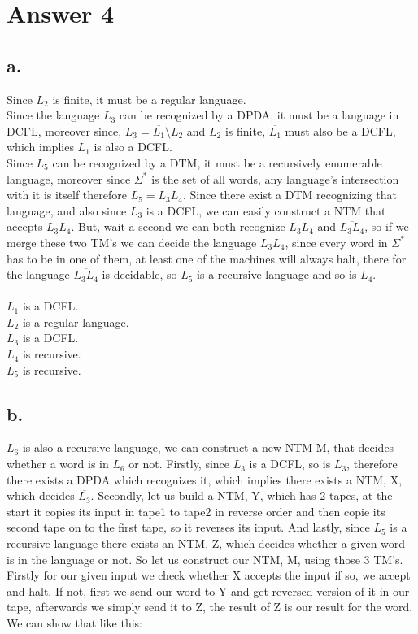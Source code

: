 \documentclass[12pt]{article}
\begin{document}
\section*{Answer 4}

\subsection*{a.}
Since $L_2$ is finite, it must be a regular language.\\
Since the language $L_3$ can be recognized by a DPDA, it must be a language in DCFL,
moreover since, $L_3=\overline{L_1}\setminus L_2$ and $L_2$ is finite, $\overline{L_1}$
must also be a DCFL, which implies $L_1$ is also a DCFL.\\
Since $L_5$ can be recognized by a DTM, it must be a recursively enumerable language, moreover
since $\Sigma^*$ is the set of all words, any language's intersection with it is itself
therefore $L_5=\overline{L_3L_4}$. Since there exist a DTM recognizing that language, and also
since $L_3$ is a DCFL, we can easily construct a NTM that accepts $L_3L_4$. But, wait a second
we can both recognize $L_3L_4$ and $\overline{L_3L_4}$, so if we merge these two TM's we can
decide the language $\overline{L_3L_4}$, since every word in $\Sigma^*$ has to be in one of them,
at least one of the machines will always halt, there for the language $\overline{L_3L_4}$ is
decidable, so $L_5$ is a recursive language and so is $L_4$.\\
\\
$L_1$ is a DCFL.\\
$L_2$ is a regular language.\\
$L_3$ is a DCFL.\\
$L_4$ is recursive.\\
$L_5$ is recursive.\\

\subsection*{b.}
$L_6$ is also a recursive language, we can construct a new NTM M, that decides whether
a word is in $L_6$ or not. Firstly, since $L_3$ is a DCFL, so is $\overline{L_3}$, therefore
there exists a DPDA which recognizes it, which implies there exists a NTM, X, which decides
$\overline{L_3}$. Secondly, let us build a NTM, Y, which has 2-tapes, at the start it copies
its input in tape1 to tape2 in reverse order and then copie its second tape on to the first
tape, so it reverses its input. And lastly, since $L_5$ is a recursive language there exists
an NTM, Z, which decides whether a given word is in the language or not. So let us construct
our NTM, M, using those 3 TM's. Firstly for our given input we check whether X accepts the input
if so, we accept and halt. If not, first we send our word to Y and get reversed version of it
in our tape, afterwards we simply send it to Z, the result of Z is our result for the word.
We can show that like this:
\end{document}
